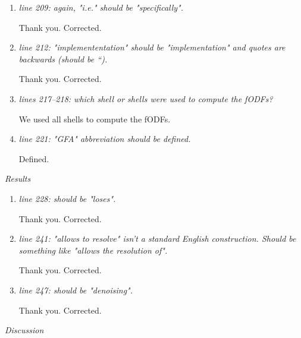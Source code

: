 \documentclass[a4paper,11pt,twoside]{report}
\begin{document}
\begin{enumerate}[resume]
    \item \textit{line 209: again, "i.e." should be "specifically".}

    \hspace{1em} Thank you. Corrected.

    \item \textit{line 212: "implemententation" should be "implementation" and quotes are backwards (should be ``).}

    \hspace{1em} Thank you. Corrected.

    \item \textit{lines 217--218: which shell or shells were used to compute the fODFs?}

    \hspace{1em} We used all shells to compute the fODFs.

    \item \textit{line 221: "GFA" abbreviation should be defined.}

    \hspace{1em} Defined.

\end{enumerate}


\noindent \textit{Results}

\begin{enumerate}[resume]
    \item \textit{line 228: should be "loses".}

    \hspace{1em} Thank you. Corrected.

    \item \textit{line 241: "allows to resolve" isn't a standard English construction. Should be something like "allows the resolution of".}

    \hspace{1em} Thank you. Corrected.

    \item \textit{line 247: should be "denoising".}

    \hspace{1em} Thank you. Corrected.

\end{enumerate}

\noindent \textit{Discussion}
\end{document}
